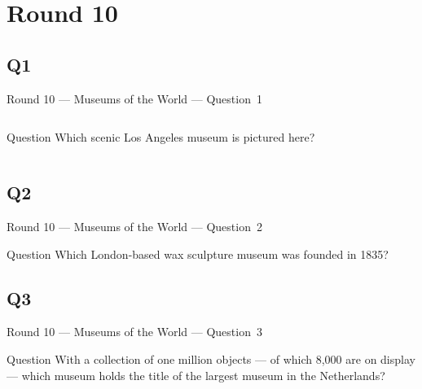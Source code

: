\documentclass[11pt]{beamer}
\begin{document}
\section{Round 10}
\subsection*{Q1}
\begin{frame}[t]{Round 10 --- Museums of the World --- \mbox{Question 1}}
\vspace{-0.5em}
\begin{columns}[T,totalwidth=\linewidth]
\begin{column}{0.32\linewidth}
\begin{block}{Question}
Which scenic Los Angeles museum is pictured here?
\end{block}
\end{column}
\begin{column}{0.65\linewidth}
\begin{center}
\texttt{[image: \{Images/getty]}.jpg}
\end{center}
\end{column}
\end{columns}
\end{frame}
\subsection*{Q2}
\begin{frame}[t]{Round 10 --- Museums of the World --- \mbox{Question 2}}
\vspace{-0.5em}
\begin{block}{Question}
Which London-based wax sculpture museum was founded in 1835?
\end{block}
\end{frame}
\subsection*{Q3}
\begin{frame}[t]{Round 10 --- Museums of the World --- \mbox{Question 3}}
\vspace{-0.5em}
\begin{block}{Question}
With a collection of one million objects --- of which 8,000 are on display --- which museum holds the title of the largest museum in the Netherlands?
\end{block}
\end{frame}
\end{document}
